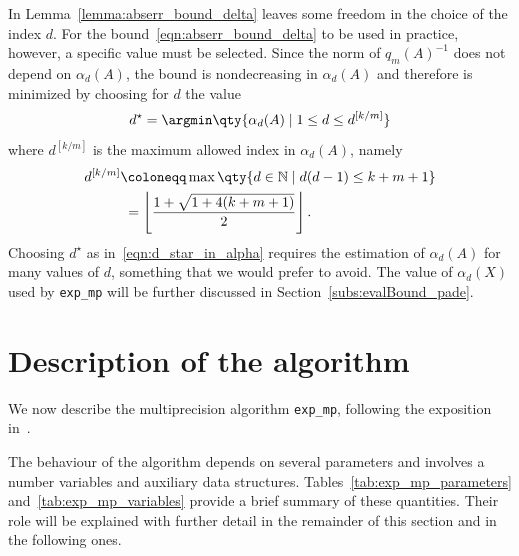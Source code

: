 In Lemma~\ref{lemma:abserr_bound_delta} leaves some freedom in the choice of the index $d$. For the bound~\eqref{eqn:abserr_bound_delta} to be used in practice, however, a specific value must be selected. Since the norm of $q_m(A)^{-1}$ does not depend on $\alpha_d(A)$, the bound is nondecreasing in $\alpha_d(A)$ and therefore is minimized by choosing for $d$ the value
\begin{equation}\label{eqn:d_star_in_alpha}
	d^{\star}=\argmin\qty{\alpha_d(A)\mid 1\le d\le d^{[k/m]}}
\end{equation}
where $d^{[k/m]}$ is the maximum allowed index in $\alpha_d(A)$, namely
\begin{equation}
\begin{aligned}\label{eqn:max_d_in_alpha}
	d^{[k/m]}&\coloneqq\max\qty{d\in\mathbb{N}\mid d(d-1)\le k+m+1}\\
	&\phantom{:}=\left\lfloor\frac{1+\sqrt{1+4(k+m+1)}}{2}\right\rfloor.
\end{aligned}
\end{equation}
Choosing $d^{\star}$ as in~\eqref{eqn:d_star_in_alpha} requires the estimation of $\alpha_d(A)$ for many values of $d$, something that we would prefer to avoid. The value of $\alpha_d(X)$ used by \texttt{exp\_mp} will be further discussed in Section~\ref{subs:evalBound_pade}.

\section{Description of the algorithm}\label{sect:exp_mp_description}
We now describe the multiprecision algorithm \texttt{exp\_mp}, following the exposition in~\cite{higham:hf19_mpexpm}. 

The behaviour of the algorithm depends on several parameters and involves a number variables and auxiliary data structures. Tables~\ref{tab:exp_mp_parameters} and~\ref{tab:exp_mp_variables} provide a brief summary of these quantities. Their role will be explained with further detail in the remainder of this section and in the following ones.

